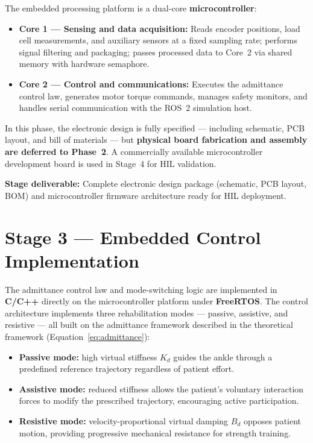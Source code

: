 The embedded processing platform is a dual-core \textbf{microcontroller}:
\begin{itemize}
    \item \textbf{Core 1 — Sensing and data acquisition:} Reads encoder positions, load cell measurements, and auxiliary sensors at a fixed sampling rate; performs signal filtering and packaging; passes processed data to Core~2 via shared memory with hardware semaphore.
    \item \textbf{Core 2 — Control and communications:} Executes the admittance control law, generates motor torque commands, manages safety monitors, and handles serial communication with the ROS~2 simulation host.
\end{itemize}

In this phase, the electronic design is fully specified — including schematic, PCB layout, and bill of materials — but \textbf{physical board fabrication and assembly are deferred to Phase~2}.
A commercially available microcontroller development board is used in Stage~4 for HIL validation.

\textbf{Stage deliverable:} Complete electronic design package (schematic, PCB layout, BOM) and microcontroller firmware architecture ready for HIL deployment.

\section{Stage 3 — Embedded Control Implementation}

The admittance control law and mode-switching logic are implemented in \textbf{C/C++} directly on the microcontroller platform under \textbf{FreeRTOS}.
The control architecture implements three rehabilitation modes — passive, assistive, and resistive — all built on the admittance framework described in the theoretical framework (Equation~\ref{eq:admittance}):

\begin{itemize}
    \item \textbf{Passive mode:} high virtual stiffness $K_d$ guides the ankle through a predefined reference trajectory regardless of patient effort.
    \item \textbf{Assistive mode:} reduced stiffness allows the patient's voluntary interaction forces to modify the prescribed trajectory, encouraging active participation.
    \item \textbf{Resistive mode:} velocity-proportional virtual damping $B_d$ opposes patient motion, providing progressive mechanical resistance for strength training.
\end{itemize}

